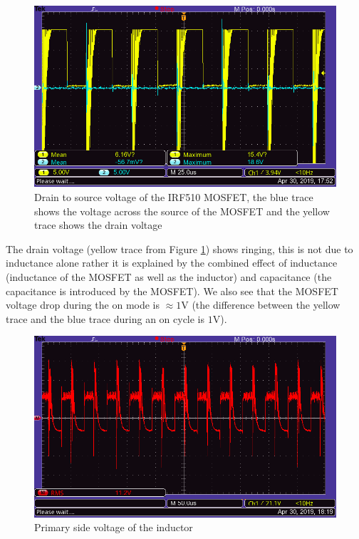 \documentclass[a4paper, 12pt]{article}
\begin{document}
\begin{figure}[H]
  \centering
  \includegraphics[width=\textwidth]{images/VDS.png}
  \caption{Drain to source voltage of the IRF510 MOSFET, the blue trace shows the voltage across the source of the MOSFET and the yellow trace shows the drain voltage}
  \label{fig:vds}
\end{figure} 

The drain voltage (yellow trace from Figure \ref{fig:vds}) shows ringing, this is not due to inductance alone rather it is explained by the combined effect of inductance (inductance of the MOSFET as well as the inductor) and capacitance (the capacitance is introduced by the MOSFET). We also see that the MOSFET voltage drop during the on mode is $\approx 1$V (the difference between the yellow trace and the blue trace during an on cycle is $1$V).
 
\begin{figure}[H]
  \centering
  \includegraphics[width=\textwidth]{images/Primary.png}
  \caption{Primary side voltage of the inductor}
  \label{fig:primary}
\end{figure} 
\end{document}
